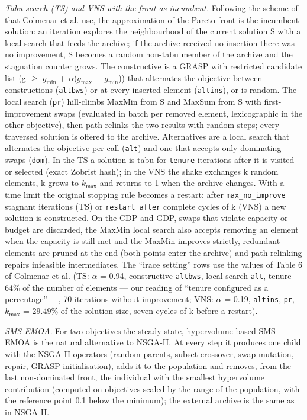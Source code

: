 \emph{Tabu search (TS) and VNS with the front as incumbent.} Following the scheme of \citet{duarte2015} that Colmenar et al. use, the approximation of the Pareto front is the incumbent solution: an iteration explores the neighbourhood of the current solution S with a local search that feeds the archive; if the archive received no insertion there was no improvement, S becomes a random non-tabu member of the archive and the stagnation counter grows. The constructive is a GRASP with restricted candidate list (g $\geq$ $g_{\mathrm{min}}$ + $\alpha$($g_{\mathrm{max}}$ $-$ $g_{\mathrm{min}}$)) that alternates the objective between constructions (\texttt{altbws}) or at every inserted element (\texttt{altins}), or is random. The local search (\texttt{pr}) hill-climbs MaxMin from S and MaxSum from S with first-improvement swaps (evaluated in batch per removed element, lexicographic in the other objective), then path-relinks the two results with random steps; every traversed solution is offered to the archive. Alternatives are a local search that alternates the objective per call (\texttt{alt}) and one that accepts only dominating swaps (\texttt{dom}). In the TS a solution is tabu for \texttt{tenure} iterations after it is visited or selected (exact Zobrist hash); in the VNS the shake exchanges k random elements, k grows to $k_{\mathrm{max}}$ and returns to 1 when the archive changes. With a time limit the original stopping rule becomes a restart: after \texttt{max\_\allowbreak{}no\_\allowbreak{}improve} stagnant iterations (TS) or \texttt{restart\_\allowbreak{}after} complete cycles of k (VNS) a new solution is constructed. On the CDP and GDP, swaps that violate capacity or budget are discarded, the MaxMin local search also accepts removing an element when the capacity is still met and the MaxMin improves strictly, redundant elements are pruned at the end (both points enter the archive) and path-relinking repairs infeasible intermediates. The ``irace setting'' rows use the values of Table 6 of Colmenar et al. (TS: $\alpha$ = 0.94, constructive \texttt{altbws}, local search \texttt{alt}, tenure 64\% of the number of elements --- our reading of ``tenure configured as a percentage'' ---, 70 iterations without improvement; VNS: $\alpha$ = 0.19, \texttt{altins}, \texttt{pr}, $k_{\mathrm{max}}$ = 29.49\% of the solution size, seven cycles of k before a restart).

\emph{SMS-EMOA.} For two objectives the steady-state, hypervolume-based SMS-EMOA \citep{beume2007} is the natural alternative to NSGA-II. At every step it produces one child with the NSGA-II operators (random parents, subset crossover, swap mutation, repair, GRASP initialisation), adds it to the population and removes, from the last non-dominated front, the individual with the smallest hypervolume contribution (computed on objectives scaled by the range of the population, with the reference point 0.1 below the minimum); the external archive is the same as in NSGA-II.

